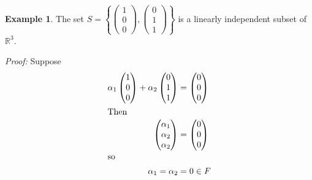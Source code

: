 \documentclass{report}
\theoremstyle{remark}
\theoremstyle{definition}
\theoremstyle{definition}
\newtheorem{example}[theorem]{Example}
\theoremstyle{theorem}
\begin{document}
\begin{example}
The set $S = \left\{ \begin{pmatrix}1\\0\\0\end{pmatrix}, \begin{pmatrix}0\\1\\1\end{pmatrix} \right\}$ is a linearly independent subset of $\mathbb{R}^3$.\par
\emph{Proof:} Suppose
\begin{align*}
    \alpha_1\begin{pmatrix}1\\0\\0\end{pmatrix} + \alpha_2\begin{pmatrix}0\\1\\1\end{pmatrix} &= \begin{pmatrix}0\\0\\0\end{pmatrix}\\
    \intertext{Then}
    \begin{pmatrix}\alpha_1\\\alpha_2\\\alpha_2\end{pmatrix} &= \begin{pmatrix}0\\0\\0\end{pmatrix}\\
    \intertext{so}
    \alpha_1=\alpha_2&=0 \in F
\end{align*}
\end{example}
\end{document}
